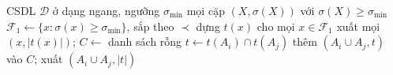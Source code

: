 \begin{algorithm}[t]
\caption{Eclat: duyệt theo chiều sâu trên các lớp tiền tố}
\label{alg:eclat}
\begin{algorithmic}[1]
\Require CSDL $\mathcal{D}$ ở dạng ngang, ngưỡng $\sigma_{\min}$
\Ensure mọi cặp $(X, \sigma(X))$ với $\sigma(X) \ge \sigma_{\min}$
\State $\mathcal{F}_1 \gets \{x : \sigma(x) \ge \sigma_{\min}\}$, sắp theo $\prec$ 
\State dựng $t(x)$ cho mọi $x \in \mathcal{F}_1$ 
\State xuất mọi $(x, |t(x)|)$; 
 
    \State $C \gets$ danh sách rỗng
      \State $t \gets t(A_i) \cap t(A_j)$ 
        \State thêm $(A_i \cup A_j, t)$ vào $C$; xuất $(A_i \cup A_j, |t|)$
      \EndIf
    \EndFor
      \State {} 
    \EndIf
  \EndFor
\EndProcedure
\end{algorithmic}
\end{algorithm}

